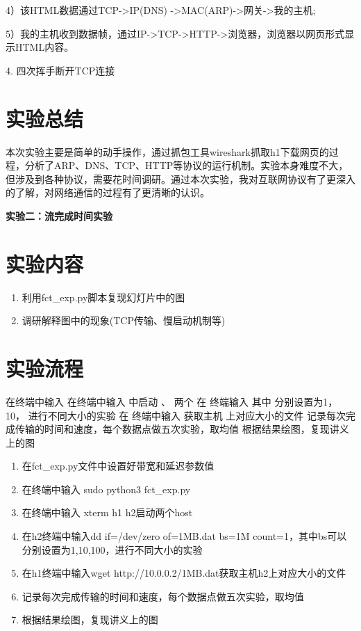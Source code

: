 \documentclass[11pt]{article}
\begin{document}
  4）该HTML数据通过TCP->IP(DNS) ->MAC(ARP)->网关->我的主机;

  5）我的主机收到数据帧，通过IP->TCP->HTTP->浏览器，浏览器以网页形式显示HTML内容。

4. 四次挥手断开TCP连接




\section{实验总结}
本次实验主要是简单的动手操作，通过抓包工具wireshark抓取h1下载网页的过程，分析了ARP、DNS、TCP、HTTP等协议的运行机制。实验本身难度不大，但涉及到各种协议，需要花时间调研。通过本次实验，我对互联网协议有了更深入的了解，对网络通信的过程有了更清晰的认识。

\newpage

\begin{center}
  \LARGE \bf 实验二：流完成时间实验
\end{center}

\setcounter{section}{0}

\section{实验内容}

\begin{enumerate}

  \item 利用fct_exp.py脚本复现幻灯片中的图
  
  \item 调研解释图中的现象(TCP传输、慢启动机制等)
  
\end{enumerate}

\section{实验流程}

在终端中输入
在终端中输入 中启动 、 两个
在 终端输入 其中
分别设置为1，10， 进行不同大小的实验
在 终端中输入 获取主机 上对应大小的文件
记录每次完成传输的时间和速度，每个数据点做五次实验，取均值
根据结果绘图，复现讲义上的图

\begin{enumerate}
  \item 在fct_exp.py文件中设置好带宽和延迟参数值
  \item 在终端中输入 sudo python3 fct_exp.py
  \item 在终端中输入 xterm h1 h2启动两个host
  \item 在h2终端中输入dd if=/dev/zero of=1MB.dat bs=1M count=1，其中bs可以分别设置为1,10,100，进行不同大小的实验
  \item 在h1终端中输入wget http://10.0.0.2/1MB.dat获取主机h2上对应大小的文件
  \item 记录每次完成传输的时间和速度，每个数据点做五次实验，取均值
  \item 根据结果绘图，复现讲义上的图
\end{enumerate}
\end{document}

